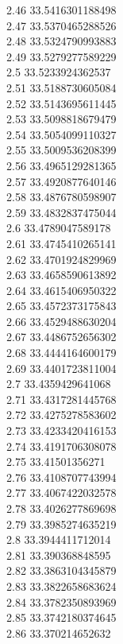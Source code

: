 {2.46	33.5416301188498\\
2.47	33.5370465288526\\
2.48	33.5324790993883\\
2.49	33.5279277589229\\
2.5	33.5233924362537\\
2.51	33.5188730605084\\
2.52	33.5143695611445\\
2.53	33.5098818679479\\
2.54	33.5054099110327\\
2.55	33.5009536208399\\
2.56	33.4965129281365\\
2.57	33.4920877640146\\
2.58	33.4876780598907\\
2.59	33.4832837475044\\
2.6	33.4789047589178\\
2.61	33.4745410265141\\
2.62	33.4701924829969\\
2.63	33.4658590613892\\
2.64	33.4615406950322\\
2.65	33.4572373175843\\
2.66	33.4529488630204\\
2.67	33.4486752656302\\
2.68	33.4444164600179\\
2.69	33.4401723811004\\
2.7	33.4359429641068\\
2.71	33.4317281445768\\
2.72	33.4275278583602\\
2.73	33.4233420416153\\
2.74	33.4191706308078\\
2.75	33.41501356271\\
2.76	33.4108707743994\\
2.77	33.4067422032578\\
2.78	33.4026277869698\\
2.79	33.3985274635219\\
2.8	33.3944411712014\\
2.81	33.390368848595\\
2.82	33.3863104345879\\
2.83	33.3822658683624\\
2.84	33.3782350893969\\
2.85	33.3742180374645\\
2.86	33.370214652632\\
}
